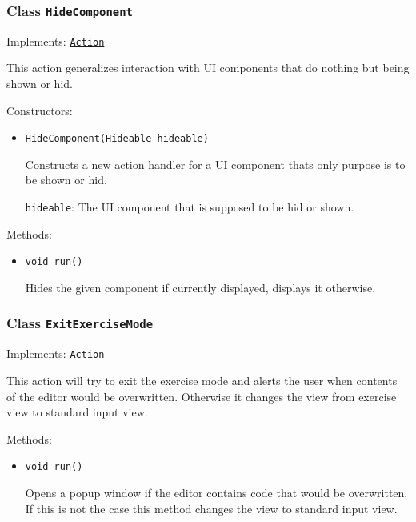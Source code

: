 \subsubsection{Class \texttt{HideComponent}}
\label{type:edu.kit.wavelength.client.view.action.HideComponent}
Implements: \texttt{\hyperref[type:edu.kit.wavelength.client.view.action.Action]{Action}}

This action generalizes interaction with UI components that do nothing but
 being shown or hid.

Constructors:
\begin{itemize}
\item \texttt{HideComponent(\hyperref[type:edu.kit.wavelength.client.view.api.Hideable]{Hideable} hideable)}

Constructs a new action handler for a UI component thats only purpose is to
 be shown or hid.

\texttt{hideable}: The UI component that is supposed to be hid or shown.

\end{itemize}

Methods:
\begin{itemize}
\item \texttt{void run()}

Hides the given component if currently displayed, displays it otherwise.

\end{itemize}

\subsubsection{Class \texttt{ExitExerciseMode}}
\label{type:edu.kit.wavelength.client.view.action.ExitExerciseMode}
Implements: \texttt{\hyperref[type:edu.kit.wavelength.client.view.action.Action]{Action}}

This action will try to exit the exercise mode and alerts the user when
 contents of the editor would be overwritten. Otherwise it changes the view
 from exercise view to standard input view.

Methods:
\begin{itemize}
\item \texttt{void run()}

Opens a popup window if the editor contains code that would be overwritten.
 If this is not the case this method changes the view to standard input view.

\end{itemize}

